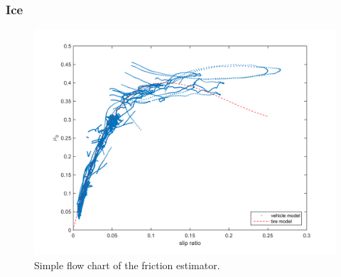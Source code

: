 \subsubsection{Ice}

\begin{figure}[h]
	\centering
	\includegraphics[width=1.0\textwidth]{Pictures/slip_kraft_is}
	\caption {Simple flow chart of the friction estimator.}
	\label{slip_kraft_is}
\end{figure}
